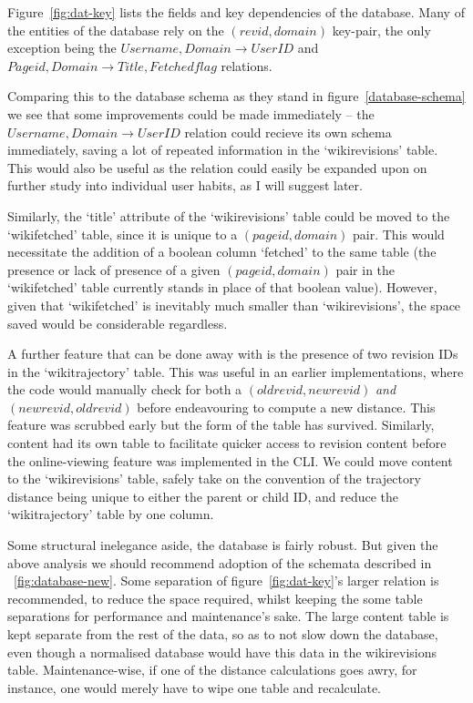 Figure~\ref{fig:dat-key} lists the fields and key dependencies of the
database. Many of the entities of the database rely on the $(revid,
domain)$ key-pair, the only exception being the $Username, Domain
\rightarrow UserID$ and $Pageid, Domain \rightarrow Title, Fetched
flag$ relations.

Comparing this to the database schema as they stand in
figure~\ref{database-schema} we see that some improvements could be
made immediately -- the $Username, Domain \rightarrow UserID$ relation
could recieve its own schema immediately, saving a lot of repeated
information in the `wikirevisions' table. This would also be useful as
the relation could easily be expanded upon on further study into
individual user habits, as I will suggest later.

Similarly, the `title' attribute of the `wikirevisions' table could be
moved to the `wikifetched' table, since it is unique to a
$(pageid,domain)$ pair. This would necessitate the addition of a
boolean column `fetched' to the same table (the presence or lack of
presence of a given $(pageid,domain)$ pair in the `wikifetched' table
currently stands in place of that boolean value). However, given that
`wikifetched' is inevitably much smaller than `wikirevisions', the
space saved would be considerable regardless.

A further feature that can be done away with is the presence of two
revision IDs in the `wikitrajectory' table. This was useful in an
earlier implementations, where the code would manually check for both
a $(oldrevid,newrevid)$ \textit{and} $(newrevid,oldrevid)$ before
endeavouring to compute a new distance. This feature was scrubbed
early but the form of the table has survived. Similarly, content had
its own table to facilitate quicker access to revision content before
the online-viewing feature was implemented in the CLI. We could move
content to the `wikirevisions' table, safely take on the convention of
the trajectory distance being unique to either the parent or child ID,
and reduce the `wikitrajectory' table by one column.

Some structural inelegance aside, the database is fairly robust. But
given the above analysis we should recommend adoption of the schemata
described in ~\ref{fig:database-new}. Some separation of
figure~\ref{fig:dat-key}'s larger relation is recommended, to reduce
the space required, whilst keeping the some table separations for
performance and maintenance's sake. The large content table is kept
separate from the rest of the data, so as to not slow down the
database, even though a normalised database would have this data in
the wikirevisions table. Maintenance-wise, if one of the distance
calculations goes awry, for instance, one would merely have to wipe
one table and recalculate.

